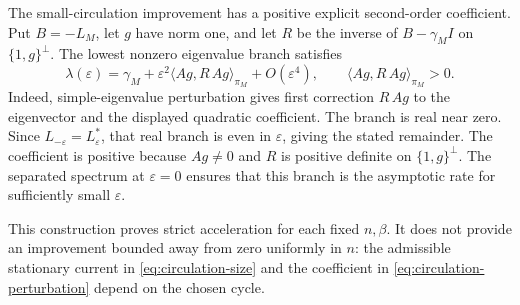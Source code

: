 The small-circulation improvement has a positive explicit
second-order coefficient.  Put $B=-L_M$, let $g$ have norm one, and
let $R$ be the inverse of $B-\gamma_M I$ on
$\{1,g\}^{\perp}$.
The lowest nonzero eigenvalue branch satisfies
\begin{equation}\label{eq:circulation-perturbation}
 \lambda(\varepsilon)
 =\gamma_M+\varepsilon^2\langle Ag,R\,Ag\rangle_{\pi_M}
     +O(\varepsilon^4),
 \qquad \langle Ag,R\,Ag\rangle_{\pi_M}>0.
\end{equation}
Indeed, simple-eigenvalue perturbation gives first correction
$R\,Ag$ to the eigenvector and the displayed quadratic coefficient.
The branch is real near zero.  Since
$L_{-\varepsilon}=L_\varepsilon^*$, that real branch is even in
$\varepsilon$, giving the stated remainder.
The coefficient is positive because $Ag\ne0$ and $R$ is positive
definite on $\{1,g\}^{\perp}$.
The separated spectrum at $\varepsilon=0$ ensures that this branch
is the asymptotic rate for sufficiently small $\varepsilon$.

This construction proves strict acceleration for each fixed
$n,\beta$.  It does not provide an improvement bounded away from
zero uniformly in $n$: the admissible stationary current in
\eqref{eq:circulation-size} and the coefficient in
\eqref{eq:circulation-perturbation} depend on the chosen cycle.
